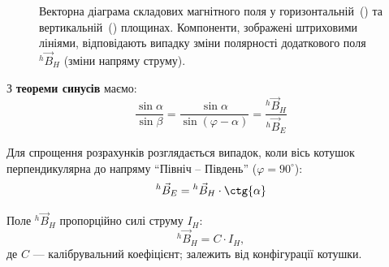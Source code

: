 \begin{figure}[ht!]
{
      }
    \caption{Векторна діаграма складових магнітного поля у   горизонтальній~(\protect{}) та  вертикальній~(\protect{}) площинах. Компоненти, зображені штриховими лініями, відповідають випадку зміни полярності додаткового поля $ {}^{h}\vec{B}_{H} $ (зміни напряму струму).}
    \label{vectordiagram}
\end{figure}

З \textbf{теореми синусів} маємо:
\begin{equation} \label{SinTheorem}
    \frac{\sin{\alpha}}{\sin{\beta}} =
    \frac{\sin{\alpha}}{\sin (\varphi - \alpha)} =
    \frac{  {}^{h}\vec{B}_{H}
           }{
           {}^{h}\vec{B}_{E}
           }
\end{equation}

Для спрощення розрахунків %
розглядається
випадок, коли вісь котушок перпендикулярна до напряму ``Північ -- Південь'' ($\varphi = 90^{\circ}$):
%
\begin{equation} \label{specialcase}
   {}^{h}\vec{B}_{E} =  {}^{h}\vec{B}_{H} \cdot \ctg{\alpha}
\end{equation}


Поле  $ {}^{h}\vec{B}_{H} $ пропорційно силі струму $I_{H}$: %
%
\begin{equation} \label{B_h}
     {}^{h}\vec{B}_{H} = C \cdot I_{H},
\end{equation}
де $C$ --- калібрувальний коефіцієнт; залежить від конфігурації котушки.


